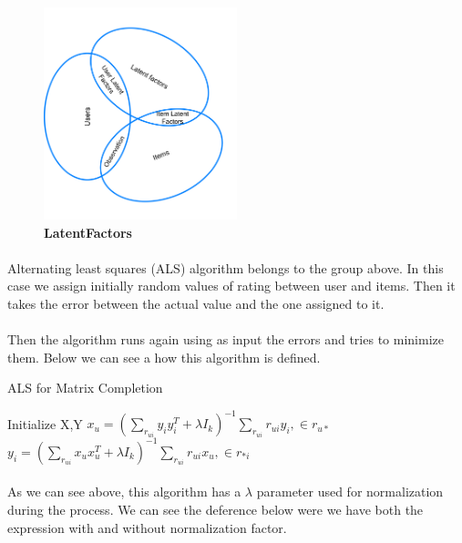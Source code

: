 \begin{figure}[h]
	\centering
	\includegraphics[width=0.5\textwidth]{images/LatentFactors.png}
	\caption{\bfseries LatentFactors}
	\label{LatentFactors}
\end{figure}


\paragraph{} Alternating least squares (ALS) algorithm belongs to the group above. In this case we assign initially random values of rating between user and items. Then it takes the error between the actual value and the one assigned to it. 
\pagebreak
\paragraph{}Then the algorithm runs again using as input the errors and tries to minimize them. Below we can see a how this algorithm is defined.

\begin{algorithm}
	\caption{ALS for Matrix Completion}\label{ALS}
	\begin{algorithmic}[1]
		\State Initialize X,Y
		\Repeat
		\State $x_{u} = (\sum_{r_{ui}}y_{i}y_{i}^{T} + \lambda I_k)^{-1} \sum_{r_{ui}}r_{ui}y_{i} ,\in r_{u*}$
		\EndFor
		\State $y_{i} = (\sum_{r_{ui}}x_{u}x_{u}^{T} + \lambda I_k)^{-1} \sum_{r_{ui}}r_{ui}x_{u} ,\in r_{*i}$
		\EndFor
	\end{algorithmic}
\end{algorithm}

\paragraph{}As we can see above, this algorithm has a $\lambda$ parameter used for normalization during the process. We can see the deference below were we have both the expression with and without normalization factor.

